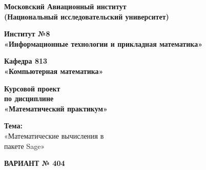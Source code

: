 \begin{titlepage}
\thispagestyle{empty}  %

\begin{center}
\textbf{
Московский Авиационный институт \\
(Национальный исследовательский университет)
}
\end{center}

\vspace{1em}
\begin{center}
\Large \textbf{ Институт №8 }\\
\large \textbf{ «Информационные технологии и прикладная математика» }\\
\end{center}

\vspace{0.5em}
\begin{center}
	\large \textbf {Кафедра 813 \\
	«Компьютерная математика» }\\
\end{center}

\vspace{0.5em}
\begin{center}
\large \textbf{Курсовой проект \\
по дисциплине \\
«Математический практикум»\\}
\end{center}

\vspace{0.5em}
\begin{center}
	\Large \textbf{ Тема:}\\
	\large«Математические вычисления в \\
	пакете Sage»
\end{center}

\vspace{1em}
\begin{center}
\Large \textbf{ВАРИАНТ № 404}\\
\end{center}


\end{titlepage}
